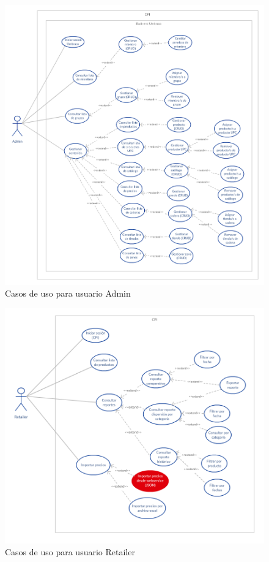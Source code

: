     \begin{figure}[H]
        \includegraphics[width=\textwidth]{cu_admin.png}
        \caption{Casos de uso para usuario Admin}
        \label{fig:cu_admin}
        \centering
    \end{figure}

    \begin{figure}[H]
        \includegraphics[scale=0.8]{cu_retailer.png}
        \caption{Casos de uso para usuario Retailer}
        \label{fig:cu_retailer}
        \centering
    \end{figure}

